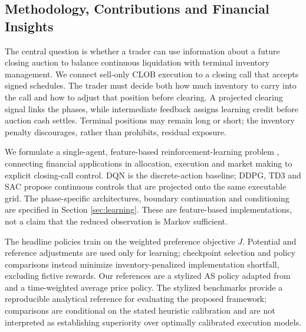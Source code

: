 \documentclass[11pt]{article}
\begin{document}
\begingroup
\subsection{Methodology, Contributions and Financial Insights}

The central question is whether a trader can use information about a future closing auction to balance continuous liquidation with terminal inventory management. We connect sell-only CLOB execution to a closing call that accepts signed schedules. The trader must decide both how much inventory to carry into the call and how to adjust that position before clearing. A projected clearing signal links the phases, while intermediate feedback assigns learning credit before auction cash settles. Terminal positions may remain long or short; the inventory penalty discourages, rather than prohibits, residual exposure.\vspace{0.5em}

We formulate a single-agent, feature-based reinforcement-learning problem \cite{sutton1998reinforcement}, connecting financial applications in allocation, execution and market making \cite{neuneier1997enhancing,ganesh2019reinforcement,kearns2013machine,ning2021double,baldacci2021algorithmic} to explicit closing-call control. DQN \cite{watkins1992q,mnih2013playing,fan2020theoretical,mnih2015human,van2016deep} is the discrete-action baseline; DDPG, TD3 and SAC \cite{lillicrap2020continuous,fujimoto2018addressing,haarnoja2018soft} propose continuous controls that are projected onto the same executable grid. The phase-specific architectures, boundary continuation and conditioning are specified in Section \ref{sec:learning}. These are feature-based implementations, not a claim that the reduced observation is Markov sufficient.\vspace{0.5em}

The headline policies train on the weighted preference objective $J$. Potential and reference adjustments are used only for learning; checkpoint selection and policy comparisons instead minimize inventory-penalized implementation shortfall, excluding fictive rewards. Our references are a stylized AS policy adapted from \cite{avellaneda2008high,gueant2013dealing} and a time-weighted average price policy. The stylized benchmarks provide a reproducible analytical reference for evaluating the proposed framework; comparisons are conditional on the stated heuristic calibration and are not interpreted as establishing superiority over optimally calibrated execution models.\vspace{0.5em}
\end{document}
